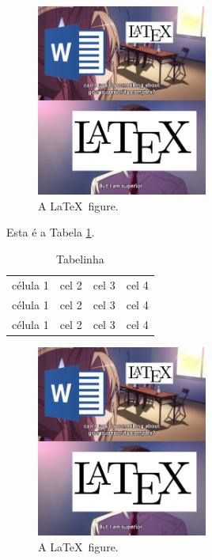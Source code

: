 \documentclass[12pt]{article}
\begin{document}
\begin{figure}[!ht]
	\centering
	\includegraphics[width=0.5\textwidth]{meme_superior.png}
	\caption{A \LaTeX\ figure.}\label{meme1}
\end{figure}

Esta é a Tabela \ref{tabelinha}.

\begin{table}
	\centering
	\begin{tabular}[c]{l c c r}
		\hline
		célula 1 & cel 2 & cel 3 & cel 4 \\
		célula 1 & cel 2 & cel 3 & cel 4 \\
		célula 1 & cel 2 & cel 3 & cel 4 \\
		\hline
	\end{tabular}
	\caption{Tabelinha}\label{tabelinha}
\end{table}

\begin{figure}[!ht]
	\centering
	\includegraphics[width=0.5\textwidth]{meme_superior.png}
	\caption{A \LaTeX\ figure.}\label{meme2}
\end{figure}
\end{document}
